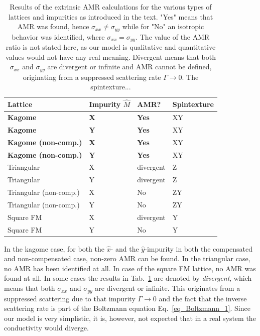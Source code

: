 \documentclass[prb,showpacs,amsmath,amssymb,superscriptaddress,twocolumn,floatfix]{revtex4-1}
\begin{document}
\begin{table}
	\begin{tabular}{llll}
	Lattice & Impurity $\hat{M}$ & AMR? & Spintexture \\
	\hline 
	\textbf{Kagome} & \textbf{X} & \textbf{Yes} & XY\\
	\textbf{Kagome} & \textbf{Y} & \textbf{Yes} & XY \\
	\textbf{Kagome (non-comp.)} & \textbf{X} & \textbf{Yes} & XY\\
	\textbf{Kagome (non-comp.)} & \textbf{Y} & \textbf{Yes} & XY \\
	\hline 
	Triangular & X & divergent & Z \\
	Triangular & Y & divergent & Z \\
	Triangular (non-comp.) & X & No & ZY \\
    Triangular (non-comp.) & Y & No & ZY \\
	\hline
	Square FM & X & divergent & Y\\
	Square FM & Y & No & Y
\end{tabular}
\caption{Results of the extrinsic AMR calculations for the various types of lattices and impurities as introduced in the text. "Yes" means that AMR was found, hence $\sigma_{xx} \neq \sigma_{yy}$ while for "No" an isotropic behavior was identified, where $\sigma_{xx} = \sigma_{yy}$. The value of the AMR ratio is not stated here, as our model is qualitative and quantitative values would not have any real meaning. Divergent means that both $\sigma_{xx}$ and $\sigma_{yy}$ are divergent or infinite and AMR cannot be defined, originating from a suppressed scattering rate $\Gamma \rightarrow 0$. {\color{red} The spintexture...}}
\label{T_extrinsic}
\end{table}

In the kagome case, for both the $\hat{x}$- and the $\hat{y}$-impurity in both the compensated and non-compensated case, non-zero AMR can be found. In the triangular case, no AMR has been identified at all. In case of the square FM lattice, no AMR was found at all. In some cases the results in Tab.~\ref{T_extrinsic} are denoted by \textit{divergent}, which means that both $\sigma_{xx}$ and $\sigma_{yy}$ are divergent or infinite. This originates from a suppressed scattering due to that impurity $\Gamma \rightarrow 0$ and the fact that the inverse scattering rate is part of the Boltzmann equation Eq.~\ref{eq_Boltzmann_1}. Since our model is very simplistic, it is, however, not expected that in a real system the conductivity would diverge.
\end{document}
